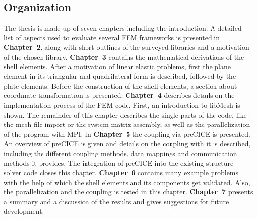 \subsection{Organization}
The thesis is made up of seven chapters including the introduction. A detailed list of aspects used to evaluate several FEM frameworks is presented in \textbf{Chapter~2}, along with short outlines of the surveyed libraries and a motivation of the chosen library. \textbf{Chapter~3} contains the mathematical derivations of the shell elements. After a motivation of linear elastic problems, first the plane element in its triangular and quadrilateral form is described, followed by the plate elements. Before the construction of the shell elements, a section about coordinate transformation is presented. \textbf{Chapter~4} describes details on the implementation process of the FEM code. First, an introduction to libMesh is shown. The remainder of this chapter describes the single parts of the code, like the mesh file import or the system matrix assembly, as well as the parallelization of the program with MPI. In \textbf{Chapter~5} the coupling via preCICE is presented. An overview of preCICE is given and details on the coupling with it is described, including the different coupling methods, data mappings and communication methods it provides. The integration of preCICE into the existing structure solver code closes this chapter. \textbf{Chapter~6} contains many example problems with the help of which the shell elements and its components get validated. Also, the parallelization and the coupling is tested in this chapter. \textbf{Chapter~7} presents a summary and a discussion of the results and gives suggestions for future development.